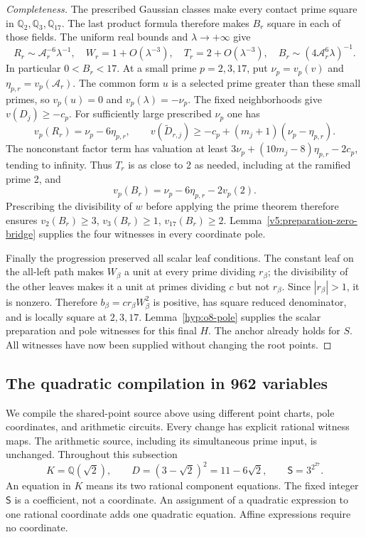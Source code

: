 \documentclass[11pt]{article}
\theoremstyle{definition}
\theoremstyle{remark}
\newcommand{\Q}{\mathbb Q}
\begin{document}
\begin{proof}[Completeness]
The prescribed Gaussian classes make every contact prime square
in $\Q_2,\Q_3,\Q_{17}$. The last product formula therefore makes
$B_r$ square in each of those fields. The uniform real bounds
and $\lambda\longrightarrow+\infty$ give
\[
 R_r\sim\mathcal A_r^{-6}\lambda^{-1},\quad
 W_r=1+O(\lambda^{-3}),\quad T_r=2+O(\lambda^{-3}),\quad
 B_r\sim(4\mathcal A_r^6\lambda)^{-1}.
\]
In particular $0<B_r<17$. At a small prime $p=2,3,17$, put
$\nu_p=v_p(v)$ and $\eta_{p,r}=v_p(\mathcal A_r)$.
The common form $u$ is a selected prime greater than these small
primes, so $v_p(u)=0$ and $v_p(\lambda)=-\nu_p$.
The fixed neighborhoods give $v(D_j)\ge-c_p$. For sufficiently
large prescribed $\nu_p$ one has
\[
 v_p(R_r)=\nu_p-6\eta_{p,r},\qquad
 v(\widetilde D_{r,j})\ge-c_p+(m_j+1)(\nu_p-\eta_{p,r}).
\]
The nonconstant factor term has valuation at least
$3\nu_p+(10m_j-8)\eta_{p,r}-2c_p$, tending to infinity.
Thus $T_r$ is as close to 2 as needed, including at the ramified
prime 2, and
\[
 v_p(B_r)=\nu_p-6\eta_{p,r}-2v_p(2).
\]
Prescribing the divisibility of $w$ before applying the prime theorem
therefore ensures $v_2(B_r)\ge3$, $v_3(B_r)\ge1$,
$v_{17}(B_r)\ge2$. Lemma~\ref{v5:preparation-zero-bridge} supplies
the four witnesses in every coordinate pole.

Finally the progression preserved all scalar leaf conditions.
The constant leaf on the all-left path makes $W_\beta$ a unit at
every prime dividing $r_\beta$; the divisibility of the other
leaves makes it a unit at primes dividing $c$ but not $r_\beta$.
Since $|r_\beta|>1$, it is nonzero. Therefore
$b_\beta=cr_\beta W_\beta^2$ is positive, has square reduced
denominator, and is locally square at $2,3,17$.
Lemma~\ref{hyp:o8-pole} supplies the scalar preparation and pole
witnesses for this final $H$. The anchor already holds for $S$.
All witnesses have now been supplied without changing the root points.
\end{proof}

\subsection{The quadratic compilation in 962 variables}
\label{subsec:v6-962-compilation}

We compile the shared-point source above using different point charts,
pole coordinates, and arithmetic circuits. Every change has explicit
rational witness maps. The arithmetic source, including its simultaneous
prime input, is unchanged. Throughout this subsection
\[
 K=\Q(\sqrt2),\qquad D=(3-\sqrt2)^2=11-6\sqrt2,
 \qquad \mathsf S=3^{2^{27}}.
\]
An equation in $K$ means its two rational component equations. The fixed
integer $\mathsf S$ is a coefficient, not a coordinate. An assignment of
a quadratic expression to one rational coordinate adds one quadratic
equation. Affine expressions require no coordinate.
\end{document}
